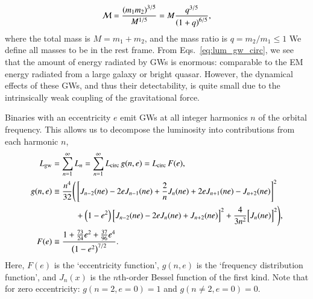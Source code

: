 \documentclass[onecolumn,authoryear]{els-mrw}
\begin{document}
\begin{align}
    \label{eq:chirp_mass}
    \mathcal{M} = \frac{\left(m_1 m_2\right)^{3/5}}{M^{1/5}} = M \frac{q^{3/5}}{\left(1 + q\right)^{6/5}},
\end{align}
where the total mass is $M = m_1 + m_2$, and the mass ratio is $q = m_2/m_1 \leq 1$  We define all masses to be in the rest frame.  From Eqs.~\ref{eq:lum_gw_circ}, we see that the amount of energy radiated by GWs is enormous: comparable to the EM energy radiated from a large galaxy or bright quasar.  However, the dynamical effects of these GWs, and thus their detectability, is quite small due to the intrinsically weak coupling of the gravitational force.

Binaries with an eccentricity $e$ emit GWs at all integer harmonics $n$ of the orbital frequency.  This allows us to decompose the luminosity into contributions from each harmonic $n$,
\begin{subequations}
\begin{align}
    \lumgw & = \sum_{n=1}^\infty L_n = \sum_{n=1}^\infty \lgwcirc \, g(n,e) = \lgwcirc \, F(e), \\
    g(n,e) & \equiv \frac{n^4}{32} \Biggl(
        \begin{aligned}[t]
            & \left[ J_{n-2}(ne) - 2eJ_{n-1}(ne) + \frac{2}{n} J_n (ne) + 2e J_{n+1} (ne) - J_{n+2} (ne) \vphantom{\frac{2}{n}}\right]^2 \\
            & + \left(1-e^2\right) \Bigl[J_{n-2}(ne) - 2eJ_n(ne) + J_{n+2}(ne)\Bigr]^2 + \frac{4}{3n^2}\Bigl[J_n(ne)\Bigr]^2 \Biggr),
        \end{aligned} \\
    F(e) & \equiv \frac{1 + \frac{73}{24} e^2 + \frac{37}{96} e^4}{\left( 1 - e^2\right)^{7/2}}.
\end{align}
\end{subequations}
Here, $F(e)$ is the `eccentricity function', $g(n,e)$ is the `frequency distribution function', and $J_n(x)$ is the $n$th-order Bessel function of the first kind.  Note that for zero eccentricity: $g(n\!=\!2,e\!=\!0) = 1$ and $g(n\!\neq\!2, e\!=\!0) = 0$.
\end{document}
